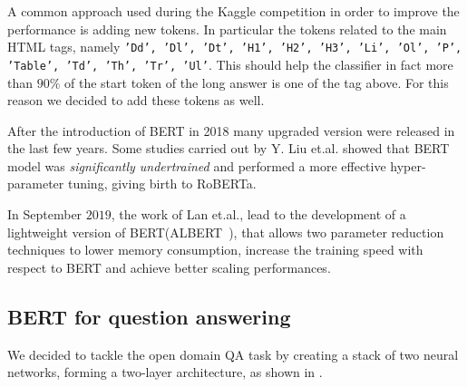 \documentclass[10pt,hidelinks]{article}
\begin{document}
A common approach used during the Kaggle competition in order to improve the performance is adding new tokens. In particular the tokens related to the main HTML tags, namely \texttt{'Dd', 'Dl', 'Dt', 'H1', 'H2', 'H3', 'Li', 'Ol', 'P', 'Table', 'Td', 'Th', 'Tr', 'Ul'}. This should help the classifier in fact more than $90\%$ of the start token of the long answer is one of the tag above. For this reason we decided to add these tokens as well. 
%

%
After the introduction of BERT in 2018 many upgraded version were released in the last few years.
%
Some studies carried out by Y. Liu et.al. showed that BERT model was \emph{significantly undertrained}\cite{roberta} and performed a more effective hyper-parameter tuning, giving birth to RoBERTa.

In September $2019$, the work of Lan et.al., lead to the development of a lightweight version of BERT(ALBERT~\cite{albert}), that  allows two parameter reduction techniques to lower memory consumption, increase the training speed with respect to BERT and achieve better scaling performances.


\subsection{BERT for question answering}
We decided to tackle the open domain QA task by creating a stack of two neural networks, forming a two-layer architecture, as shown in .
\end{document}
